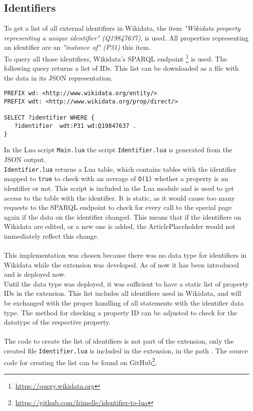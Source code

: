 \subsection{Identifiers}

To get a list of all external identifiers in Wikidata, the item \textit{"Wikidata property representing a unique identifier" (Q19847637)}, is used. All properties representing an identifier are an \textit{"instance of" (P31)} this item. \\
To query all those identifiers, Wikidata's SPARQL endpoint \footnote{\href{https://query.wikidata.org}{https://query.wikidata.org}} is used. The following query returns a list of IDs. This list can be downloaded as a file with the data in its JSON representation. \\

\begin{lstlisting}[frame=single] 
PREFIX wd: <http://www.wikidata.org/entity/>
PREFIX wdt: <http://www.wikidata.org/prop/direct/>

SELECT ?identifier WHERE {
   ?identifier  wdt:P31 wd:Q19847637 . 
}
\end{lstlisting}

In the Lua script \texttt{\justify Main.lua} the script \texttt{\justify Identifier.lua} is generated from the JSON output. \\  \texttt{\justify Identifier.lua} returns a Lua table, which contains tables with the identifier mapped to \texttt{true} to check with an average of \texttt{\justify O(1)} whether a property is an identifier or not. This script is included in the Lua module and is used to get access to the table with the identifier. It is static, as it would cause too many requests to the SPARQL endpoint to check for every call to the special page again if the data on the identifier changed. This means that if the identifiers on Wikidata are edited, or a new one is added, the ArticlePlaceholder would not immediately reflect this change. \\
\\
This implementation was chosen because there was no data type for identifiers in Wikidata while the extension was developed. As of now it has been introduced and is deployed now. \\
Until the data type was deployed, it was sufficient to have a static list of property IDs in the extension. This list includes all identifiers used in Wikidata, and will be exchanged with the proper handling of all statements with the identifier data type. The method for checking a property ID can be adjusted to check for the datatype of the respective property. \\
\\
The code to create the list of identifiers is not part of the extension, only the created file \texttt{\justify Identifier.lua} is included in the extension, in the path . The source code for creating the list can be found on GitHub\footnote{\url{https://github.com/frimelle/identifier-to-lua}}. 
